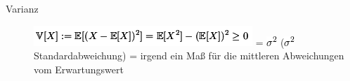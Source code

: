 \documentclass[11pt]{article}
\begin{document}
\begin{description}
\item[Varianz] \includegraphics[width=.9\linewidth]{zettelkasten.org_20121229_215420_14976asg.png} = \includegraphics[width=.9\linewidth]{201212ad-21574114976n2m.png} (\includegraphics[width=.9\linewidth]{201301ad-00394849495FS.png} Standardabweichung)
           = irgend ein Maß für die mittleren Abweichungen vom Erwartungswert

\end{description}
\end{document}
